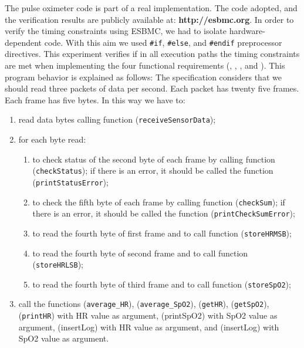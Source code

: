 \documentclass{llncs}
\begin{document}
The pulse oximeter code is part of a real implementation.
The code adopted, and the verification results are publicly available at: {\bf http://esbmc.org}. 
In order to verify the timing constraints using ESBMC, we had to isolate hardware-dependent code. 
With this aim we used {\tt \#if}, {\tt \#else}, and {\tt \#endif} preprocessor directives.
This experiment verifies if in all execution paths the timing constraints are met 
when implementing the four functional requirements (, , , and ). 
This program behavior is explained as follows:
The specification considers that we should read three packets of data per second. 
Each packet has twenty five frames.
Each frame has five bytes.
In this way we have to:
\begin{enumerate}
  \item read data bytes calling function  ({\tt receiveSensorData});
  \item for each byte read:
  \begin{enumerate}
    \item to check status of the second byte of each frame by calling function  ({\tt checkStatus}); 
    if there is an error, it should be called the function  ({\tt printStatusError});
    \item to check the fifth byte of each frame by calling function  ({\tt checkSum}); 
    if there is an error, it should be called the function  ({\tt printCheckSumError});
    \item to read the fourth byte of first frame and to call function  ({\tt storeHRMSB});
    \item to read the fourth byte of second frame and to call function  ({\tt storeHRLSB});
    \item to read the fourth byte of third frame and to call function  ({\tt storeSpO2});
  \end{enumerate}
  \item call the functions  ({\tt average\_HR}),  ({\tt average\_SpO2}),  ({\tt getHR}),  ({\tt getSpO2}), 
 ({\tt printHR}) with HR value as argument,  ({printSpO2}) with SpO2 value as argument, 
 ({insertLog}) with HR value as argument, and  ({insertLog}) with SpO2 value as argument.
\end{enumerate}
\end{document}

